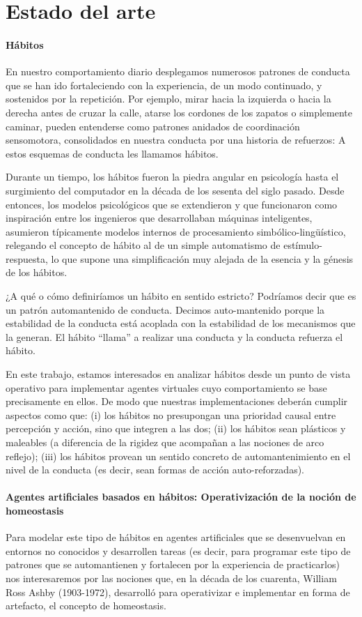 \chapter{Estado del arte}
\subsubsection{Hábitos}
En nuestro comportamiento diario desplegamos numerosos patrones de conducta que se han ido fortaleciendo con la experiencia, de un modo continuado, y sostenidos por la repetición. Por ejemplo, mirar hacia la izquierda o hacia la derecha antes de cruzar la calle, atarse los cordones de los zapatos o simplemente caminar, pueden entenderse como patrones anidados de coordinación sensomotora, consolidados en nuestra conducta por una historia de refuerzos: A estos esquemas de conducta les llamamos hábitos.

Durante un tiempo, los hábitos fueron la piedra angular en psicología hasta el surgimiento del computador en la década de los sesenta del siglo pasado. Desde entonces, los modelos psicológicos que se extendieron y que funcionaron como inspiración entre los ingenieros que desarrollaban máquinas inteligentes, asumieron típicamente modelos internos de procesamiento simbólico-lingüístico, relegando el concepto de hábito al de un simple automatismo de estímulo-respuesta, lo que supone una simplificación muy alejada de la esencia y la génesis de los hábitos.

¿A qué o cómo definiríamos un hábito en sentido estricto? Podríamos decir que es un patrón automantenido de conducta. Decimos auto-mantenido porque la estabilidad de la conducta está acoplada con la estabilidad de los mecanismos que la generan. El hábito ``llama'' a realizar una conducta y la conducta refuerza el hábito.

En este trabajo, estamos interesados en analizar hábitos desde un punto de vista operativo para implementar agentes virtuales cuyo comportamiento se base precisamente en ellos. De modo que nuestras implementaciones deberán cumplir aspectos como que: (i) los hábitos no presupongan una prioridad causal entre percepción y acción, sino que integren a las dos; (ii) los hábitos sean plásticos y maleables (a diferencia de la rigidez que acompañan a las nociones de arco reflejo); (iii) los hábitos provean un sentido concreto de automantenimiento en el nivel de la conducta (es decir, sean formas de acción auto-reforzadas).

\subsubsection{Agentes artificiales basados en hábitos: Operativización de la noción de homeostasis}
Para modelar este tipo de hábitos en agentes artificiales que se desenvuelvan en entornos no conocidos y desarrollen tareas (es decir, para programar este tipo de patrones que se automantienen y fortalecen por la experiencia de practicarlos) nos interesaremos por las nociones que, en la década de los cuarenta, William Ross Ashby (1903-1972), desarrolló para operativizar e implementar en forma de artefacto, el concepto de homeostasis.

